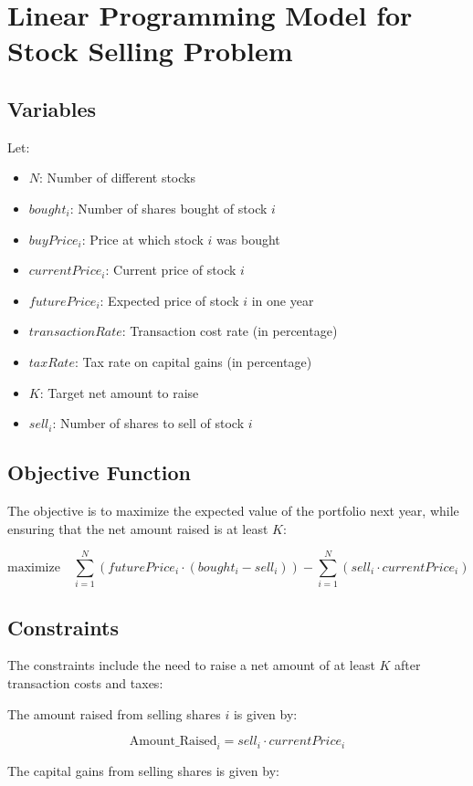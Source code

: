 \documentclass{article}
\begin{document}
\section*{Linear Programming Model for Stock Selling Problem}

\subsection*{Variables}
Let:
\begin{itemize}
    \item $N$: Number of different stocks
    \item $bought_i$: Number of shares bought of stock $i$
    \item $buyPrice_i$: Price at which stock $i$ was bought
    \item $currentPrice_i$: Current price of stock $i$
    \item $futurePrice_i$: Expected price of stock $i$ in one year
    \item $transactionRate$: Transaction cost rate (in percentage)
    \item $taxRate$: Tax rate on capital gains (in percentage)
    \item $K$: Target net amount to raise
    \item $sell_i$: Number of shares to sell of stock $i$
\end{itemize}

\subsection*{Objective Function}
The objective is to maximize the expected value of the portfolio next year, while ensuring that the net amount raised is at least $K$:

\[
\text{maximize} \quad \sum_{i=1}^{N} (futurePrice_i \cdot (bought_i - sell_i)) - \sum_{i=1}^{N} (sell_i \cdot currentPrice_i)
\]

\subsection*{Constraints}
The constraints include the need to raise a net amount of at least $K$ after transaction costs and taxes:

The amount raised from selling shares $i$ is given by:

\[
\text{Amount\_Raised}_i = sell_i \cdot currentPrice_i
\]

The capital gains from selling shares is given by:
\end{document}

